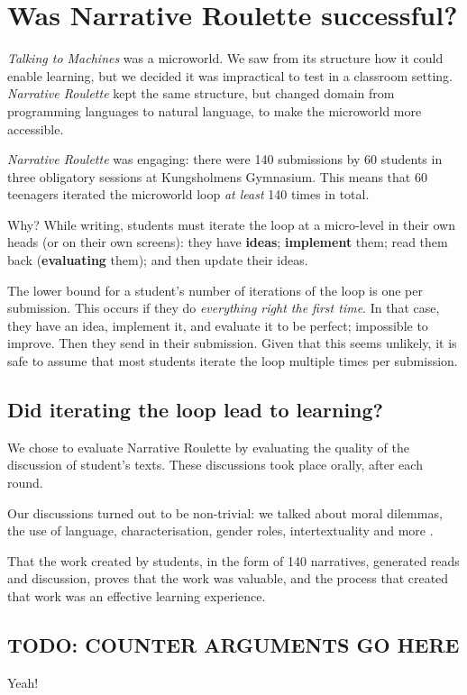 \section{Was Narrative Roulette successful?}

\emph{Talking to Machines} was a microworld. We saw from its structure
how it could enable learning, but we decided it was impractical to test
in a classroom setting. \emph{Narrative Roulette} kept the same
structure, but changed domain from programming languages to natural
language, to make the microworld more accessible.

\emph{Narrative Roulette} was engaging: there were
140 submissions by 60 students in three obligatory sessions at Kungsholmens Gymnasium. This means that 60 teenagers iterated the microworld
loop \emph{at least} 140 times in total.

Why? While writing, students must iterate the loop at a micro-level in
their own heads (or on their own screens): they have \textbf{ideas}; \textbf{implement}
them; read them back (\textbf{evaluating} them); and then update their ideas. 

The lower bound for a student's number of iterations of the loop is one per submission. This occurs if they do \emph{everything right the first time}. In that case,
they have an idea, implement it, and evaluate it to be perfect;
impossible to improve. Then they send in their submission. Given that this seems unlikely, it is safe to assume that most students iterate the loop multiple times
per submission.

\subsection{Did iterating the loop lead to learning?}

We chose to evaluate Narrative Roulette by evaluating the quality of the discussion of student's texts. These discussions took place orally, after each round. 

Our discussions turned out to be non-trivial: we talked about moral dilemmas, the use of language, characterisation, gender roles, intertextuality and more \cite{ingulfson}. 

That the work created by students, in the form of 140 narratives, generated reads and discussion, proves that the work was valuable, and the process that created that work was an effective learning experience.   

\subsection{TODO: COUNTER ARGUMENTS GO HERE}
Yeah!
